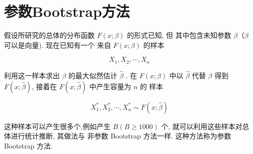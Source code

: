 \section{参数Bootstrap方法}

假设所研究的总体的分布函数 $ F(x ; \beta) $ 的形式已知, 但 其中包含未知参数 $ \beta （ \beta $ 可以是向量). 现在已知有一个 来自 $ F(x ; \beta) $ 的样本

$$ X_{1}, X_{2}, \cdots, X_{n} $$

利用这一样本求出 $ \beta $ 的最大似然估计 $ \hat{\beta} $ . 在 $ F(x ; \beta) $ 中以 $ \hat{\beta} $ 代替 $ \beta $ 得到 $ F(x ; \hat{\beta}) $, 接着在 $ F(x ; \hat{\beta}) $ 中产生容量为 $ n $ 的 样本

$$ X_{1}^{*}, X_{2}^{*}, \cdots, X_{n}^{*} \sim F(x ; \hat{\beta}) $$

这种样本可以产生很多个,例如产生 $ B(B \geq 1000) $ 个, 就可以利用这些样本对总体进行统计推断, 其做法与 非参数 Bootstrap 方法一样. 这种方法称为参数 Bootstrap 方法. 